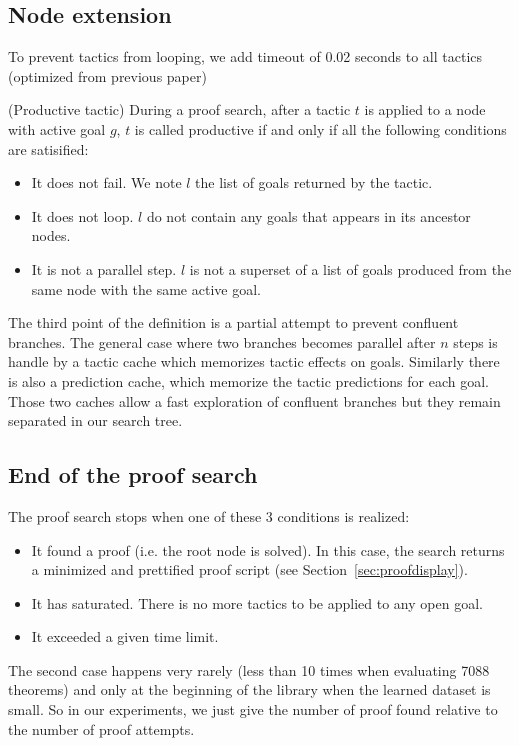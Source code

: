 \documentclass[runningheads,a4paper,draft]{svjour3}
\begin{document}
\subsection{Node extension}

To prevent tactics from looping, we add timeout of 0.02 seconds to all tactics 
(optimized from previous paper)

\begin{definition} (Productive tactic)
During a proof search, after a tactic $t$ is applied to a node with active goal 
$g$, 
$t$ is called 
productive if and only if all the following conditions are satisified:
\begin{itemize}
\item It does not fail. We note $l$ the list of goals returned by the tactic.
\item It does not loop. $l$ do not contain any goals that appears in its 
ancestor nodes.
\item It is not a parallel step. $l$ is not a superset of a list of goals 
produced from the same node with the same active goal.
\end{itemize}

The third point of the definition is a partial attempt to prevent confluent 
branches. The general 
case where two branches becomes parallel after $n$ steps is handle by a
tactic cache which memorizes tactic effects on goals. Similarly there is also a 
prediction cache, which memorize the tactic predictions for each goal. Those 
two caches allow a fast exploration of confluent branches but they remain 
separated in our search tree.

\subsection{End of the proof search}
The proof search stops when one of these 3 conditions is realized:
\begin{itemize}
\item It found a proof (i.e. the root node is solved). In this case, 
the search returns a minimized and 
prettified proof script (see Section~\ref{sec:proofdisplay}).
\item It has saturated. 
There is no more tactics to be applied to any open goal. 
\item It exceeded a given time limit.
\end{itemize}

The second case happens very rarely (less than 10 times when evaluating 7088 
theorems) and only at the beginning of the library when the learned dataset is 
small. So in our experiments, we just give the number of proof found relative 
to the number of proof attempts.



\end{definition}
\end{document}
